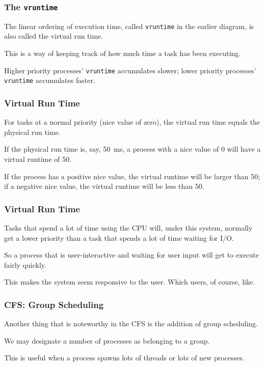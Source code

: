\begin{frame}
\frametitle{The \texttt{vruntime}}

The linear ordering of execution time, called \texttt{vruntime} in the earlier diagram, is also called the \alert{virtual run time}.

 This is a way of keeping track of how much time a task has been executing. 
 
 Higher priority processes' \texttt{vruntime} accumulates slower; lower priority processes' \texttt{vruntime} accumulates faster.
 

\end{frame}

\begin{frame}
\frametitle{Virtual Run Time}

For tasks at a normal priority (nice value of zero), the virtual run time equals the physical run time. 

If the physical run time is, say, 50~ms, a process with a nice value of 0 will have a virtual runtime of 50. 

If the process has a positive nice value, the virtual runtime will be larger than 50; if a negative nice value, the virtual runtime will be less than 50.

\end{frame}



\begin{frame}
\frametitle{Virtual Run Time}

Tasks that spend a lot of time using the CPU will, under this system, normally get a lower priority than a task that spends a lot of time waiting for I/O.

So a process that is user-interactive and waiting for user input will get to execute fairly quickly.

This makes the system seem responsive to the user. Which users, of course, like.

\end{frame}

\begin{frame}
\frametitle{CFS: Group Scheduling}

Another thing that is noteworthy in the CFS is the addition of group scheduling. 

We may designate a number of processes as belonging to a group. 

This is useful when a process spawns lots of threads or lots of new processes. 


\end{frame}

